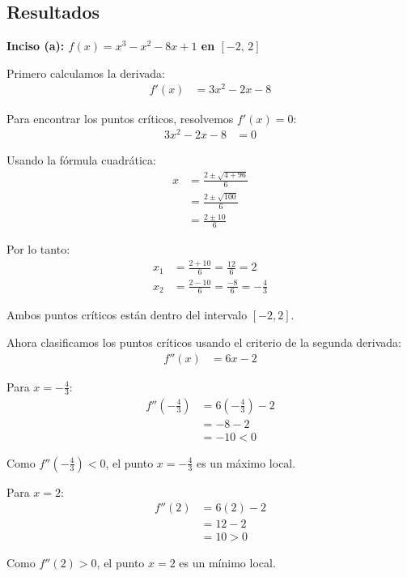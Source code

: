 \documentclass{article}
\begin{document}
\subsection{Resultados}
\setcounter{equation}{0}

\textbf{Inciso (a): $f(x) = x^{3} - x^{2} - 8x + 1$ en $[-2,\,2]$}

Primero calculamos la derivada:
\begin{align}
f'(x) &= 3x^{2} - 2x - 8
\end{align}

Para encontrar los puntos críticos, resolvemos $f'(x) = 0$:
\begin{align}
3x^{2} - 2x - 8 &= 0
\end{align}

Usando la fórmula cuadrática:
\begin{align}
x &= \frac{2 \pm \sqrt{4 + 96}}{6} \\
&= \frac{2 \pm \sqrt{100}}{6} \\
&= \frac{2 \pm 10}{6}
\end{align}

Por lo tanto:
\begin{align}
x_{1} &= \frac{2 + 10}{6} = \frac{12}{6} = 2 \\
x_{2} &= \frac{2 - 10}{6} = \frac{-8}{6} = -\frac{4}{3}
\end{align}

Ambos puntos críticos están dentro del intervalo $[-2, 2]$.

Ahora clasificamos los puntos críticos usando el criterio de la segunda derivada:
\begin{align}
f''(x) &= 6x - 2
\end{align}

Para $x = -\frac{4}{3}$:
\begin{align}
f''\left(-\frac{4}{3}\right) &= 6\left(-\frac{4}{3}\right) - 2 \\
&= -8 - 2 \\
&= -10 < 0
\end{align}

Como $f''(-\frac{4}{3}) < 0$, el punto $x = -\frac{4}{3}$ es un máximo local.

Para $x = 2$:
\begin{align}
f''(2) &= 6(2) - 2 \\
&= 12 - 2 \\
&= 10 > 0
\end{align}

Como $f''(2) > 0$, el punto $x = 2$ es un mínimo local.
\end{document}
